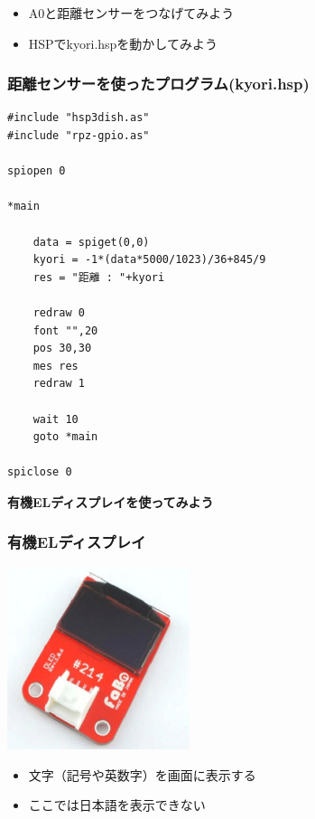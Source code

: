 \begin{frame}[fragile]
\begin{columns}
\begin{column}{0.48\textwidth}
        \end{column}
    \end{columns}
    \begin{itemize}
        \item A0と距離センサーをつなげてみよう
        \item HSPでkyori.hspを動かしてみよう
    \end{itemize}
\end{frame}

\begin{frame}[fragile]
    \frametitle{距離センサーを使ったプログラム(kyori.hsp)}
\begin{lstlisting}
#include "hsp3dish.as"
#include "rpz-gpio.as"

spiopen 0

*main

	data = spiget(0,0)
	kyori = -1*(data*5000/1023)/36+845/9
	res = "距離 : "+kyori
	
	redraw 0
	font "",20
	pos 30,30
	mes res
	redraw 1

	wait 10
	goto *main

spiclose 0
\end{lstlisting}
\end{frame}

\begin{frame}[plain]
    \begin{center}
        \vspace{48pt}
        {\huge\bf 有機ELディスプレイを使ってみよう}
    \end{center}
\end{frame}

\begin{frame}
    \frametitle{有機ELディスプレイ}
    \begin{center}
        \includegraphics[width=0.4\textwidth]{images/chap05/text05-img025.png}
        \begin{itemize}
            \item 文字（記号や英数字）を画面に表示する
            \item ここでは日本語を表示できない
        \end{itemize}
    \end{center}
\end{frame}

